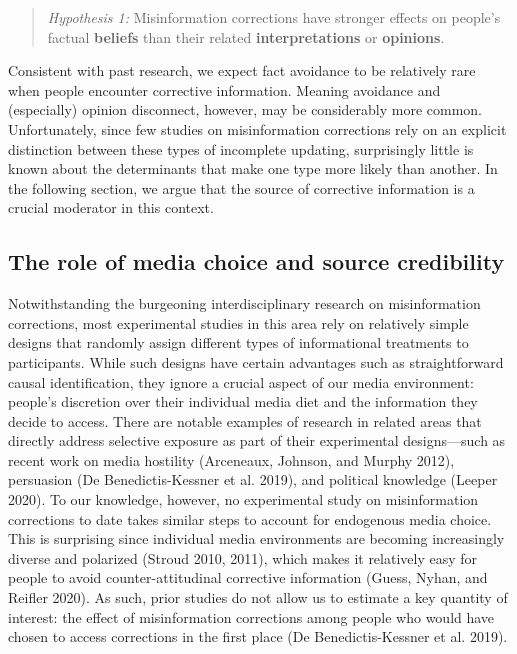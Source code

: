 \documentclass[
  12pt,
]{article}
\begin{document}
\singlespace

\begin{quote}
\emph{Hypothesis 1:} Misinformation corrections have stronger effects on
people's factual \textbf{beliefs} than their related
\textbf{interpretations} or \textbf{opinions}.
\end{quote}

\vspace{1em}\doublespace

\noindent Consistent with past research, we expect fact avoidance to be
relatively rare when people encounter corrective information. Meaning
avoidance and (especially) opinion disconnect, however, may be
considerably more common. Unfortunately, since few studies on
misinformation corrections rely on an explicit distinction between these
types of incomplete updating, surprisingly little is known about the
determinants that make one type more likely than another. In the
following section, we argue that the source of corrective information is
a crucial moderator in this context.

\hypertarget{the-role-of-media-choice-and-source-credibility}{%
\subsection{The role of media choice and source
credibility}\label{the-role-of-media-choice-and-source-credibility}}

Notwithstanding the burgeoning interdisciplinary research on
misinformation corrections, most experimental studies in this area rely
on relatively simple designs that randomly assign different types of
informational treatments to participants. While such designs have
certain advantages such as straightforward causal identification, they
ignore a crucial aspect of our media environment: people's discretion
over their individual media diet and the information they decide to
access. There are notable examples of research in related areas that
directly address selective exposure as part of their experimental
designs---such as recent work on media hostility (Arceneaux, Johnson,
and Murphy 2012), persuasion (De Benedictis-Kessner et al. 2019), and
political knowledge (Leeper 2020). To our knowledge, however, no
experimental study on misinformation corrections to date takes similar
steps to account for endogenous media choice. This is surprising since
individual media environments are becoming increasingly diverse and
polarized (Stroud 2010, 2011), which makes it relatively easy for people
to avoid counter-attitudinal corrective information (Guess, Nyhan, and
Reifler 2020). As such, prior studies do not allow us to estimate a key
quantity of interest: the effect of misinformation corrections among
people who would have chosen to access corrections in the first place
(De Benedictis-Kessner et al. 2019).
\end{document}
